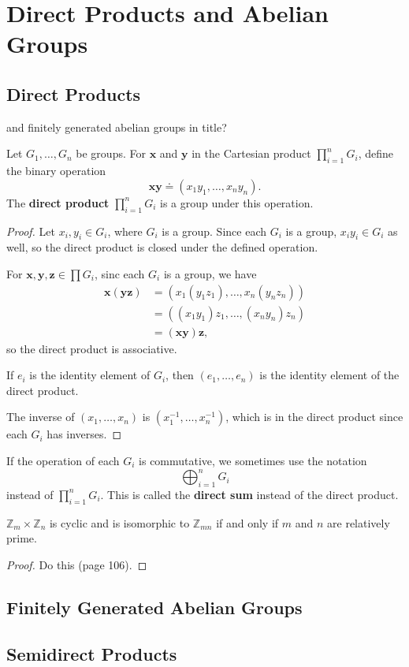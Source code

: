 \documentclass[10pt]{report}
\begin{document}
\chapter{Direct Products and Abelian Groups}



\section{Direct Products}

{\color{red}and finitely generated abelian groups in title?}

\begin{thrm}{}{}
Let $G_1, \dots, G_n$ be groups. For $\mathbf{x}$ and $\mathbf{y}$ in the Cartesian product $\prod_{i=1}^n G_i$, define the binary operation
\[
	\mathbf{x}\mathbf{y} \doteq (x_1y_1, \dots, x_n y_n).
\] The \textbf{direct product} $\prod_{i=1}^n G_i$ is a group under this operation.
\end{thrm}
\begin{proof}
	Let $x_i, y_i \in G_i$, where $G_i$ is a group. Since each $G_i$ is a group, $x_i y_i \in G_i$ as well, so the direct product is closed under the defined operation.

	For $\mathbf{x},\mathbf{y},\mathbf{z} \in \prod G_i$, sinc each $G_i$ is a group, we have
	\begin{align*}
		\mathbf{x}(\mathbf{y}\mathbf{z}) &= (x_1(y_1z_1), \dots, x_n(y_n z_n)) \\
						 &= ( (x_1y_1)z_1, \dots, (x_n y_n)z_n) \\
						 &= (\mathbf{x}\mathbf{y})\mathbf{z},
	\end{align*}
	so the direct product is associative.

	If $e_i$ is the identity element of $G_i$, then $(e_1, \dots, e_n)$ is the identity element of the direct product.

	The inverse of $(x_1, \dots, x_n)$ is $(x_1^{-1}, \dots, x_n^{-1})$, which is in the direct product since each $G_i$ has inverses.
\end{proof}

\begin{note}{}{}
	If the operation of each $G_i$ is commutative, we sometimes use the notation \[\bigoplus_{i=1}^n G_i\] instead of $\prod_{i=1}^n G_i$. This is called the \textbf{direct sum} instead of the direct product.
\end{note}

\begin{thrm}{}{}
$\mathbb{Z}_m \times \mathbb{Z}_n$ is cyclic and is isomorphic to $\mathbb{Z}_{mn}$ if and only if $m$ and $n$ are relatively prime.
\end{thrm}
\begin{proof}
	{\color{red}Do this (page 106).}
\end{proof}



\section{Finitely Generated Abelian Groups}



\section{Semidirect Products}
\end{document}
